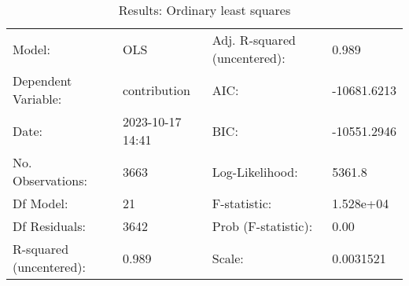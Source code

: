 \begin{table}
\caption{Results: Ordinary least squares}
\label{}
\begin{center}
\begin{tabular}{llll}
\hline
Model:                  & OLS              & Adj. R-squared (uncentered): & 0.989        \\
Dependent Variable:     & contribution     & AIC:                         & -10681.6213  \\
Date:                   & 2023-10-17 14:41 & BIC:                         & -10551.2946  \\
No. Observations:       & 3663             & Log-Likelihood:              & 5361.8       \\
Df Model:               & 21               & F-statistic:                 & 1.528e+04    \\
Df Residuals:           & 3642             & Prob (F-statistic):          & 0.00         \\
R-squared (uncentered): & 0.989            & Scale:                       & 0.0031521    \\
\hline
\end{tabular}
\end{center}


\end{table}
